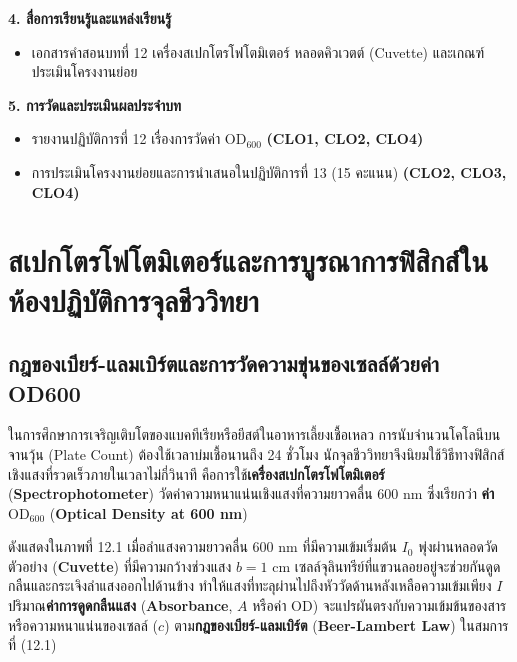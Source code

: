 \begin{planbox}
\noindent\textbf{4. สื่อการเรียนรู้และแหล่งเรียนรู้}
\begin{itemize}
    \item เอกสารคำสอนบทที่ 12 เครื่องสเปกโตรโฟโตมิเตอร์ หลอดคิวเวตต์ (Cuvette) และเกณฑ์ประเมินโครงงานย่อย
\end{itemize}

\noindent\textbf{5. การวัดและประเมินผลประจำบท}
\begin{itemize}
    \item รายงานปฏิบัติการที่ 12 เรื่องการวัดค่า $\text{OD}_{600}$ \textbf{(CLO1, CLO2, CLO4)}
    \item การประเมินโครงงานย่อยและการนำเสนอในปฏิบัติการที่ 13 (15 คะแนน) \textbf{(CLO2, CLO3, CLO4)}
\end{itemize}
\end{planbox}
\clearpage

\chapter{สเปกโตรโฟโตมิเตอร์และการบูรณาการฟิสิกส์ในห้องปฏิบัติการจุลชีววิทยา}

\section{กฎของเบียร์-แลมเบิร์ตและการวัดความขุ่นของเซลล์ด้วยค่า OD600}

ในการศึกษาการเจริญเติบโตของแบคทีเรียหรือยีสต์ในอาหารเลี้ยงเชื้อเหลว การนับจำนวนโคโลนีบนจานวุ้น (Plate Count) ต้องใช้เวลาบ่มเชื้อนานถึง 24 ชั่วโมง นักจุลชีววิทยาจึงนิยมใช้วิธีทางฟิสิกส์เชิงแสงที่รวดเร็วภายในเวลาไม่กี่วินาที คือการใช้\textbf{เครื่องสเปกโตรโฟโตมิเตอร์} (\textbf{Spectrophotometer}) วัดค่าความหนาแน่นเชิงแสงที่ความยาวคลื่น $600\text{ nm}$ ซึ่งเรียกว่า \textbf{ค่า $\text{OD}_{600}$} (\textbf{Optical Density at 600 nm})

ดังแสดงใน\mbox{ภาพที่} 12.1 เมื่อลำแสงความยาวคลื่น $600\text{ nm}$ ที่มีความเข้มเริ่มต้น $I_0$ พุ่งผ่านหลอดวัดตัวอย่าง (\textbf{Cuvette}) ที่มีความกว้างช่วงแสง $b = 1\text{ cm}$ เซลล์จุลินทรีย์ที่แขวนลอยอยู่จะช่วยกันดูดกลืนและกระเจิงลำแสงออกไปด้านข้าง ทำให้แสงที่ทะลุผ่านไปถึงหัววัดด้านหลังเหลือความเข้มเพียง $I$ ปริมาณ\textbf{ค่าการดูดกลืนแสง} (\textbf{Absorbance}, $A$ หรือค่า $\text{OD}$) จะแปรผันตรงกับความเข้มข้นของสารหรือความหนาแน่นของเซลล์ ($c$) ตาม\textbf{กฎของเบียร์-แลมเบิร์ต} (\textbf{Beer-Lambert Law}) ในสมการที่ (12.1)

